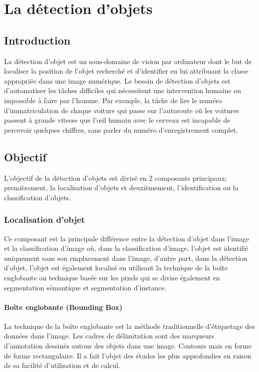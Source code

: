  \chapter{La détection d'objets}
\minitoc
\newpage
\pagestyle{fancy}
\fancyhead[L]{\chaptername \ \thechapter}
\renewcommand{\headrulewidth}{1pt}
\fancyfoot[C]{\thepage}

\section{Introduction} 
La détection d'objet est un sous-domaine de vision par ordinateur dont le but de localiser la position de l'objet recherché et d'identifier en lui attribuant la classe appropriée dans une image numérique. Le besoin de détection d'objets est d'automatiser les tâches difficiles qui nécessitent une intervention humaine ou impossible à faire par l'homme. Par exemple, la tâche de lire le numéro d'immatriculation
de chaque voiture qui passe sur l'autoroute où les voitures passent à grande vitesse que l'œil humain avec le cerveau est incapable de percevoir quelques chiffres, sans parler du numéro d'enregistrement complet.

\section{Objectif}
L'objectif de la détection d'objets est divisé en 2 composants principaux; premièrement, la localisation d'objets et deuxièmement, l'identification ou la classification d'objets.
     \subsection{Localisation d'objet}
     Ce composant est la principale différence entre la détection d'objet dans l'image et la classification d'image où, dans la classification d'image, l'objet est identifié uniquement sans son emplacement dans l'image, d'autre part, dans la détection d'objet, l'objet est également localisé en utilisant la technique de la boîte englobante ou technique basée sur les pixels qui se divise également en segmentation sémantique et segmentation d'instance.
     \subsubsection{Boîte englobante (Bounding Box)}
     La technique de la boîte englobante est la méthode traditionnelle d'étiquetage des données dans l'image. Les cadres de délimitation sont des marqueurs d'annotation dessinés autour des objets dans une image. Contours mais en forme de forme rectangulaire. Il a fait l'objet des études les plus approfondies en raison de sa facilité d'utilisation et de calcul.

